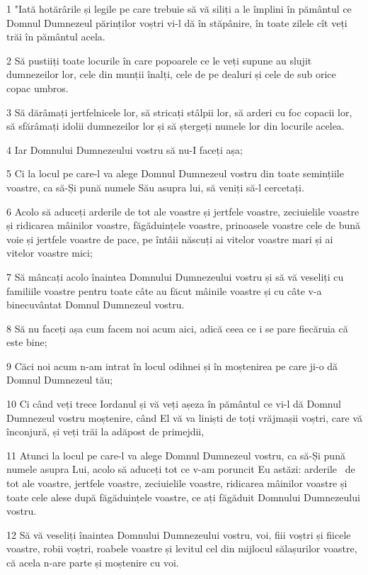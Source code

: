 \par 1 "Iată hotărârile și legile pe care trebuie să vă siliți a le împlini în pământul ce Domnul Dumnezeul părinților voștri vi-l dă în stăpânire, în toate zilele cît veți trăi în pământul acela.
\par 2 Să pustiiți toate locurile în care popoarele ce le veți supune au slujit dumnezeilor lor, cele din munții înalți, cele de pe dealuri și cele de sub orice copac umbros.
\par 3 Să dărâmați jertfelnicele lor, să stricați stâlpii lor, să arderi cu foc copacii lor, să sfărâmați idolii dumnezeilor lor și să ștergeți numele lor din locurile acelea.
\par 4 Iar Domnului Dumnezeului vostru să nu-I faceți așa;
\par 5 Ci la locul pe care-l va alege Domnul Dumnezeul vostru din toate semințiile voastre, ca să-Și pună numele Său asupra lui, să veniți să-l cercetați.
\par 6 Acolo să aduceți arderile de tot ale voastre și jertfele voastre, zeciuielile voastre și ridicarea mâinilor voastre, făgăduințele voastre, prinoasele voastre cele de bună voie și jertfele voastre de pace, pe întâii născuți ai vitelor voastre mari și ai vitelor voastre mici;
\par 7 Să mâncați acolo înaintea Domnului Dumnezeului vostru și să vă veseliți cu familiile voastre pentru toate câte au făcut mâinile voastre și cu câte v-a binecuvântat Domnul Dumnezeul vostru.
\par 8 Să nu faceți așa cum facem noi acum aici, adică ceea ce i se pare fiecăruia că este bine;
\par 9 Căci noi acum n-am intrat în locul odihnei și în moștenirea pe care ji-o dă Domnul Dumnezeul tău;
\par 10 Ci când veți trece Iordanul și vă veți așeza în pământul ce vi-l dă Domnul Dumnezeul vostru moștenire, când El vă va liniști de toți vrăjmașii voștri, care vă înconjură, și veți trăi la adăpost de primejdii,
\par 11 Atunci la locul pe care-l va alege Domnul Dumnezeul vostru, ca să-Și pună numele asupra Lui, acolo să aduceți tot ce v-am poruncit Eu astăzi: arderile  de tot ale voastre, jertfele voastre, zeciuielile voastre, ridicarea mâinilor voastre și toate cele alese după făgăduințele voastre, ce ați făgăduit Domnului Dumnezeului vostru.
\par 12 Să vă veseliți înaintea Domnului Dumnezeului vostru, voi, fiii voștri și fiicele voastre, robii voștri, roabele voastre și levitul cel din mijlocul sălașurilor voastre, că acela n-are parte și moștenire cu voi.
